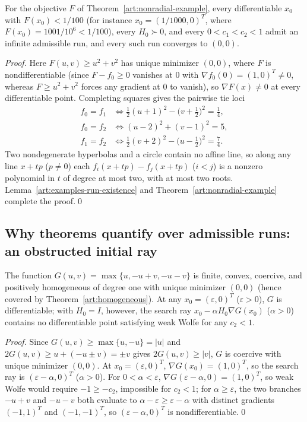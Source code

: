 \begin{corollary}\label{art:examples-nonradial-runs}
For the objective $F$ of Theorem~\ref{art:nonradial-example}, every
differentiable $x_0$ with $F(x_0)<1/100$ (for instance $x_0=(1/1000,0)^T$, where
$F(x_0)=1001/10^6<1/100$), every $H_0\succ0$, and every $0<c_1<c_2<1$ admit an
infinite admissible run, and every such run converges to $(0,0)$.
\end{corollary}
\begin{proof}
Here $F(u,v)\ge u^2+v^2$ has unique minimizer $(0,0)$, where $F$ is
nondifferentiable (since $F-f_0\ge0$ vanishes at $0$ with
$\nabla f_0(0)=(1,0)^T\ne0$, whereas $F\ge u^2+v^2$ forces any gradient at $0$
to vanish), so $\nabla F(x)\ne0$ at every differentiable point. Completing
squares gives the pairwise tie loci
\[
 \begin{aligned}
 f_0=f_1&\iff \tfrac12(u+1)^2-\bigl(v+\tfrac12\bigr)^2=\tfrac14,\\
 f_0=f_2&\iff (u-2)^2+(v-1)^2=5,\\
 f_1=f_2&\iff \tfrac12(v+2)^2-\bigl(u-\tfrac12\bigr)^2=\tfrac74.
 \end{aligned}
\]
Two nondegenerate hyperbolas and a circle contain no affine line, so along any
line $x+tp$ ($p\ne0$) each $f_i(x+tp)-f_j(x+tp)$ ($i<j$) is a nonzero polynomial
in $t$ of degree at most two, with at most two roots. Lemma~\ref{art:examples-run-existence}
and Theorem~\ref{art:nonradial-example} complete the proof.\qed
\end{proof}

\subsection{Why theorems quantify over admissible runs: an obstructed initial ray}

\begin{proposition}\label{art:examples-no-step}
The function $G(u,v)=\max\{u,-u+v,-u-v\}$ is finite, convex, coercive, and
positively homogeneous of degree one with unique minimizer $(0,0)$ (hence covered
by Theorem~\ref{art:homogeneous}). At any $x_0=(\varepsilon,0)^T$
($\varepsilon>0$), $G$ is differentiable; with $H_0=I$, however, the search ray
$x_0-\alpha H_0\nabla G(x_0)$ ($\alpha>0$) contains no differentiable
point satisfying weak Wolfe for any $c_2<1$.
\end{proposition}
\begin{proof}
Since $G(u,v)\ge\max\{u,-u\}=|u|$ and $2G(u,v)\ge u+(-u\pm v)=\pm v$ gives
$2G(u,v)\ge|v|$, $G$ is coercive with unique minimizer $(0,0)$. At
$x_0=(\varepsilon,0)^T$, $\nabla G(x_0)=(1,0)^T$, so the search ray is
$(\varepsilon-\alpha,0)^T$ ($\alpha>0$). For $0<\alpha<\varepsilon$,
$\nabla G(\varepsilon-\alpha,0)=(1,0)^T$, so weak Wolfe would require
$-1\ge-c_2$, impossible for $c_2<1$; for $\alpha\ge\varepsilon$, the two branches $-u+v$ and $-u-v$ both evaluate to
$\alpha-\varepsilon\ge\varepsilon-\alpha$ with distinct gradients $(-1,1)^T$ and
$(-1,-1)^T$, so $(\varepsilon-\alpha,0)^T$ is nondifferentiable.\qed
\end{proof}

